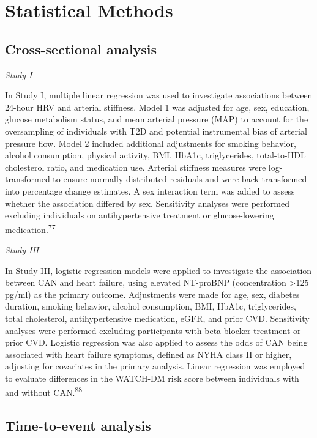 \documentclass[
  letterpaper,
  headsepline=true,
  open=any]{scrbook}
\begin{document}
\hypertarget{statistical-methods}{%
\section{Statistical Methods}\label{statistical-methods}}

\hypertarget{cross-sectional-analysis}{%
\subsection{Cross-sectional analysis}\label{cross-sectional-analysis}}

\emph{Study I}

In Study I, multiple linear regression was used to investigate
associations between 24-hour HRV and arterial stiffness. Model 1 was
adjusted for age, sex, education, glucose metabolism status, and mean
arterial pressure (MAP) to account for the oversampling of individuals
with T2D and potential instrumental bias of arterial pressure flow.
Model 2 included additional adjustments for smoking behavior, alcohol
consumption, physical activity, BMI, HbA1c, triglycerides, total-to-HDL
cholesterol ratio, and medication use. Arterial stiffness measures were
log-transformed to ensure normally distributed residuals and were
back-transformed into percentage change estimates. A sex interaction
term was added to assess whether the association differed by sex.
Sensitivity analyses were performed excluding individuals on
antihypertensive treatment or glucose-lowering
medication.\textsuperscript{77}

\emph{Study III}

In Study III, logistic regression models were applied to investigate the
association between CAN and heart failure, using elevated NT-proBNP
(concentration \textgreater125 pg/ml) as the primary outcome.
Adjustments were made for age, sex, diabetes duration, smoking behavior,
alcohol consumption, BMI, HbA1c, triglycerides, total cholesterol,
antihypertensive medication, eGFR, and prior CVD. Sensitivity analyses
were performed excluding participants with beta-blocker treatment or
prior CVD. Logistic regression was also applied to assess the odds of
CAN being associated with heart failure symptoms, defined as NYHA class
II or higher, adjusting for covariates in the primary analysis. Linear
regression was employed to evaluate differences in the WATCH-DM risk
score between individuals with and without CAN.\textsuperscript{88}

\hypertarget{time-to-event-analysis}{%
\subsection{Time-to-event analysis}\label{time-to-event-analysis}}
\end{document}
